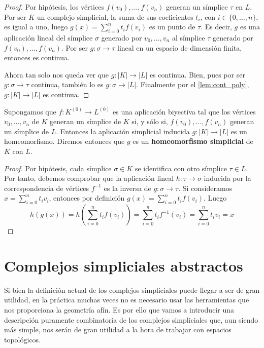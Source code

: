 \begin{proof}
	Por hipótesis, los vértices \(f(v_{0}), \ldots, f(v_{n})\) generan un símplice
	\(\tau\) en \(L\). Por ser \(K\) un complejo simplicial, la suma de sus coeficientes
	\(t_{i}\), con \(i \in \{0, \ldots, n\}\), es igual a uno, luego \(g(x) = \sum_{i=0}^{n}
	t_{i}f(v_{i})\) es un punto de \(\tau\). Es decir, \(g\) es una aplicación lineal del
	símplice \(\sigma\) generado por \(v_{0}, \ldots, v_{n}\) al símplice \(\tau\) generado
	por \(f(v_{0}), \ldots, f(v_{n})\). Por ser \(g: \sigma \rightarrow \tau\) lineal
	en un espacio de dimensión finita, entonces es continua.

	Ahora tan solo nos queda ver que \(g:|K| \rightarrow |L|\) es continua. Bien, pues
	por ser \(g: \sigma \rightarrow \tau\) continua, también lo es
	\(g: \sigma \rightarrow |L|\). Finalmente por el \autoref{lem:cont_poly},
	\(g:|K| \rightarrow |L|\) es continua.
\end{proof}

\begin{lema}
	\label{lem:homeo_complex} Supongamos que \(f:K^{(0)}\rightarrow L^{(0)}\) es una
	aplicación biyectiva tal que los vértices \(v_{0}, \ldots, v_{n}\) de \(K\) generan
	un símplice de \(K\) si, y sólo si, \(f(v_{0}), \ldots, f(v_{n})\) generan un símplice
	de \(L\). Entonces la aplicación simplicial inducida \(g:|K| \rightarrow |L|\) es
	un homeomorfismo. Diremos entonces que \(g\) es un \textbf{homeomorfismo
	simplicial} de \(K\) con \(L\).
\end{lema}

\begin{proof}
	Por hipótesis, cada símplice \(\sigma \in K\) se identifica con otro símplice
	\(\tau \in L\). Por tanto, debemos comprobar que la aplicación lineal
	\(h: \tau \rightarrow \sigma\) inducida por la correspondencia de vértices
	\(f^{-1}\) es la inversa de \(g: \sigma \rightarrow \tau\). Si consideramos \(x = \sum
	_{i=0}^{n}t_{i}v_{i}\), entonces por definición
	\(g(x) = \sum_{i=0}^{n}t_{i}f(v_{i})\). Luego
	\[
		h(g(x)) = h(\sum_{i=0}^{n}t_{i}f(v_{i})) = \sum_{i=0}^{n}t_{i}f^{-1}(v_{i}) =
		\sum_{i=0}^{n}t_{i}v_{i}= x
	\]
\end{proof}

\section{Complejos simpliciales abstractos}

Si bien la definición actual de los complejos simpliciales puede llegar a ser de
gran utilidad, en la práctica muchas veces no es necesario usar las herramientas
que nos proporciona la geometría afín. Es por ello que vamos a introducir una
descripción puramente combinatoria de los complejos simpliciales que, aun siendo
más simple, nos serán de gran utilidad a la hora de trabajar con espacios
topológicos.


